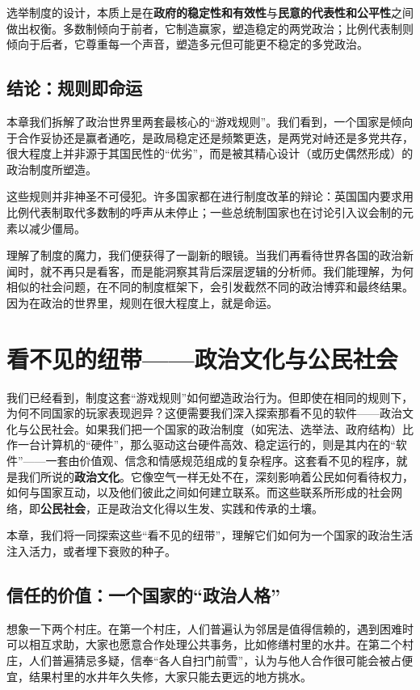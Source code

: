 \documentclass[a5paper, 11pt, openany]{ctexbook}
\begin{document}
选举制度的设计，本质上是在\textbf{政府的稳定性和有效性}与\textbf{民意的代表性和公平性}之间做出权衡。多数制倾向于前者，它制造赢家，塑造稳定的两党政治；比例代表制则倾向于后者，它尊重每一个声音，塑造多元但可能更不稳定的多党政治。

\section*{结论：规则即命运}

本章我们拆解了政治世界里两套最核心的“游戏规则”。我们看到，一个国家是倾向于合作妥协还是赢者通吃，是政局稳定还是频繁更迭，是两党对峙还是多党共存，很大程度上并非源于其国民性的“优劣”，而是被其精心设计（或历史偶然形成）的政治制度所塑造。

这些规则并非神圣不可侵犯。许多国家都在进行制度改革的辩论：英国国内要求用比例代表制取代多数制的呼声从未停止；一些总统制国家也在讨论引入议会制的元素以减少僵局。

理解了制度的魔力，我们便获得了一副新的眼镜。当我们再看待世界各国的政治新闻时，就不再只是看客，而是能洞察其背后深层逻辑的分析师。我们能理解，为何相似的社会问题，在不同的制度框架下，会引发截然不同的政治博弈和最终结果。因为在政治的世界里，规则在很大程度上，就是命运。

\chapter{看不见的纽带——政治文化与公民社会}

我们已经看到，制度这套“游戏规则”如何塑造政治行为。但即使在相同的规则下，为何不同国家的玩家表现迥异？这便需要我们深入探索那看不见的软件——政治文化与公民社会。如果我们把一个国家的政治制度（如宪法、选举法、政府结构）比作一台计算机的“硬件”，那么驱动这台硬件高效、稳定运行的，则是其内在的“软件”——一套由价值观、信念和情感规范组成的复杂程序。这套看不见的程序，就是我们所说的\textbf{政治文化}。它像空气一样无处不在，深刻影响着公民如何看待权力，如何与国家互动，以及他们彼此之间如何建立联系。而这些联系所形成的社会网络，即\textbf{公民社会}，正是政治文化得以生发、实践和传承的土壤。

本章，我们将一同探索这些“看不见的纽带”，理解它们如何为一个国家的政治生活注入活力，或者埋下衰败的种子。

\section{信任的价值：一个国家的“政治人格”}

想象一下两个村庄。在第一个村庄，人们普遍认为邻居是值得信赖的，遇到困难时可以相互求助，大家也愿意合作处理公共事务，比如修缮村里的水井。在第二个村庄，人们普遍猜忌多疑，信奉“各人自扫门前雪”，认为与他人合作很可能会被占便宜，结果村里的水井年久失修，大家只能去更远的地方挑水。
\end{document}
